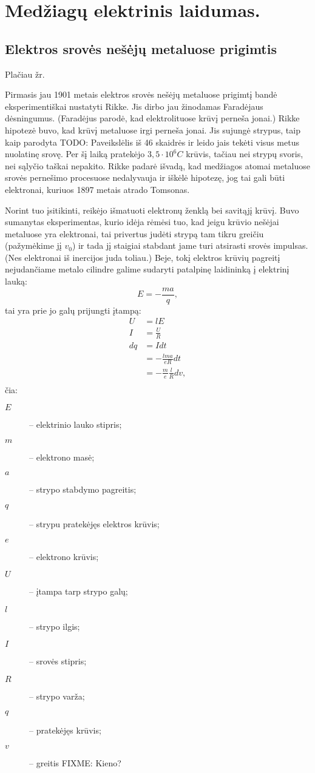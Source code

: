 \chapter{Medžiagų elektrinis laidumas.}

\section{Elektros srovės nešėjų metaluose prigimtis}

Plačiau žr. \cite[53p.]{elektra-magnetizmas}

Pirmasis jau 1901 metais elektros srovės nešėjų metaluose prigimtį
bandė eksperimentiškai nustatyti Rikke. Jis dirbo jau žinodamas
Faradėjaus dėsningumus. (Faradėjus parodė, kad elektrolituose
krūvį perneša jonai.) Rikke hipotezė buvo, kad krūvį metaluose
irgi perneša jonai.  Jis sujungė strypus, taip kaip parodyta TODO:
Paveikslėlis iš 46 skaidrės ir leido jais tekėti visus metus
nuolatinę srovę. Per šį laiką pratekėjo $3,5\cdot 10^{6}C$
krūvis, tačiau nei strypų svoris, nei sąlyčio taškai nepakito.
Rikke padarė išvadą, kad medžiagos atomai metaluose srovės
pernešimo procesuose nedalyvauja ir iškėlė hipotezę, jog
tai gali būti elektronai, kuriuos 1897 metais atrado Tomsonas.

Norint tuo įsitikinti, reikėjo išmatuoti elektronų ženklą bei
savitąjį krūvį. Buvo sumanytas eksperimentas, kurio idėja rėmėsi
tuo, kad jeigu krūvio nešėjai metaluose yra elektronai,
tai privertus judėti strypą tam tikru greičiu (pažymėkime jį
$v_{0}$) ir tada jį staigiai stabdant jame turi atsirasti srovės
impulsas. (Nes elektronai iš inercijos juda toliau.) Beje, tokį
elektros krūvių pagreitį nejudančiame metalo cilindre galime
sudaryti patalpinę laidininką į elektrinį lauką:
\begin{equation*}
  E = -\frac{ma}{q},
\end{equation*}
tai yra prie jo galų prijungti įtampą:
\begin{align*}
  U &= lE \\
  I &= \frac{U}{R} \\
  dq
  &= Idt \\
  &= -\frac{lma}{eR}dt \\
  &= -\frac{m}{e}\frac{l}{R}dv, \\
\end{align*}
čia:
\begin{description}
  \item[$E$] – elektrinio lauko stipris;
  \item[$m$] – elektrono masė;
  \item[$a$] – strypo stabdymo pagreitis;
  \item[$q$] – strypu pratekėjęs elektros krūvis;
  \item[$e$] – elektrono krūvis;
  \item[$U$] – įtampa tarp strypo galų;
  \item[$l$] – strypo ilgis;
  \item[$I$] – srovės stipris;
  \item[$R$] – strypo varža;
  \item[$q$] – pratekėjęs krūvis;
  \item[$v$] – greitis FIXME: Kieno?
\end{description}

